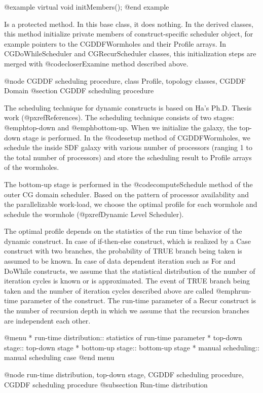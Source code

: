 {@example
virtual void initMembers();
@end example

Is a protected method. In this base class, it does nothing. In the
derived classes, this method initialize private members of construct-specific
scheduler object, for example pointers to the CGDDFWormholes and their
Profile arrays. In CGDoWhileScheduler and CGRecurScheduler classes,
this initialization steps are merged with @code{closerExamine} method
described above.

@node CGDDF scheduling procedure, class Profile, topology classes, CGDDF Domain
@section CGDDF scheduling procedure

The scheduling technique for dynamic constructs is based on Ha's Ph.D.
Thesis work (@pxref{References}). The scheduling technique consists of
two stages: @emph{top-down} and @emph{bottom-up}. When we initialize 
the galaxy,
the top-down stage is performed. In the @code{setup} method of CGDDFWormholes,
we schedule the inside SDF galaxy with various number of processors
(ranging 1 to the total number of processors) and store the scheduling
result to Profile arrays of the wormholes. 

The bottom-up stage is performed in the @code{computeSchedule} method of
the outer CG domain scheduler. Based on the pattern of processor
availability and the parallelizable work-load, we choose the
optimal profile for each wormhole and schedule the wormhole
(@pxref{Dynamic Level Scheduler}). 

The optimal profile depends on
the statistics of the run time behavior of the dynamic construct.
In case of if-then-else construct, which is realized by a Case construct with
two branches, the probability of TRUE branch being taken is assumed to be
known. In case of data dependent iteration such as For and DoWhile constructs,
we assume that the statistical distribution of the number of
iteration cycles is known or is approximated. The event of TRUE branch
being taken and the number of iteration cycles described above are
called @emph{run-time parameter} of the construct. The run-time
parameter of a Recur construct is the number of recursion depth in which
we assume that the recursion branches are independent each other.

@menu
* run-time distribution::	statistics of run-time parameter
* top-down stage::		top-down stage
* bottom-up stage::		bottom-up stage
* manual scheduling::		manual scheduling case
@end menu

@node run-time distribution, top-down stage, CGDDF scheduling procedure, CGDDF scheduling procedure
@subsection Run-time distribution

}
